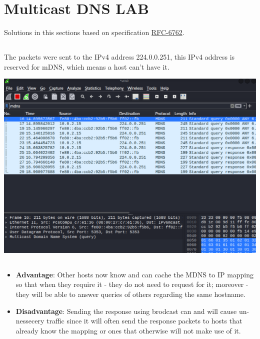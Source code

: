 \section{Multicast DNS LAB}
Solutions in this sections based on specification \href{https://tools.ietf.org/html/rfc6762}{RFC-6762}.

\subsection{}
The packets were sent to the IPv4 address 224.0.0.251, this IPv4 address is reserved for
mDNS, which  means a host can't have it.
\begin{center}
    \includegraphics[width=1.2 \textwidth]{resources/q2-1.png}\centering
\end{center}


\subsection{}
\begin{itemize}
    \item \textbf{Advantage}: Other hosts now know and can cache the MDNS to IP mapping
    so that when they require it - they do not need to request for it; moreover - 
    they will be able to answer queries of others regarding the same hostname.
    \item \textbf{Disadvantage}: Sending the response using brodcast can and will cause
    un-nessecery traffic since it will often send the response packets to hosts that already know
    the mapping or ones that otherwise will not make use of it.
\end{itemize}


